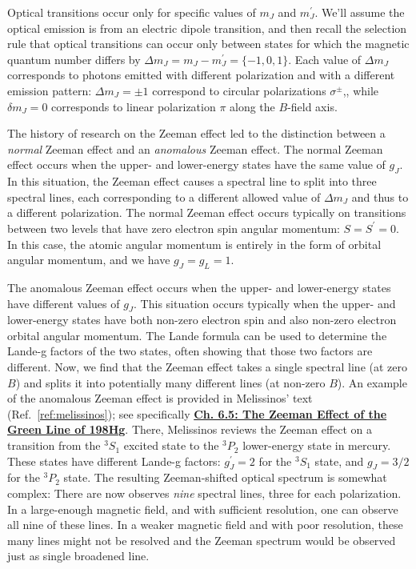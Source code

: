 \documentclass{../lab}
\begin{document}
Optical transitions occur only for specific values of $m_J$ and $m_J^\prime$.  We'll assume the optical emission is from an electric dipole transition, and then recall the selection rule that optical transitions can occur only between states for which the magnetic quantum number differs by $\Delta m_J = m_J - m_J^\prime = \{-1, 0, 1\}$.   Each value of $\Delta m_J$ corresponds to photons emitted with different polarization and with a different emission pattern:  $\Delta m_J = \pm 1$ correspond to circular polarizations $\sigma^\pm$,, while $\delta m_J = 0$ corresponds to linear polarization $\pi$ along the $B$-field axis.

The history of research on the Zeeman effect led to the distinction between a \emph{normal} Zeeman effect and an \emph{anomalous} Zeeman effect.  The normal Zeeman effect occurs when the upper- and lower-energy states have the same value of $g_J$.  In this situation, the Zeeman effect causes a spectral line to split into three spectral lines, each corresponding to a different allowed value of $\Delta m_J$ and thus to a different polarization.  The normal Zeeman effect occurs typically on transitions between two levels that have zero electron spin angular momentum: $S = S^\prime = 0$.  In this case, the atomic angular momentum is entirely in the form of orbital angular momentum, and we have $g_J = g_L = 1$.

The anomalous Zeeman effect occurs when the upper- and lower-energy states have different values of $g_J$.  This situation occurs typically when the upper- and lower-energy states have both non-zero electron spin and also non-zero electron orbital angular momentum.  The Lande formula can be used to determine the Lande-g factors of the two states, often showing that those two factors are different.  Now, we find that the Zeeman effect takes a single spectral line (at zero $B$) and splits it into potentially many different lines (at non-zero $B$). 
An example of the anomalous Zeeman effect is provided in Melissinos' text (Ref.\ \ref{ref:melissinos}); see specifically  \href{https://drive.google.com/file/d/1GhpjxWvfQqXUVwYPoIaDtat9mbd5f0mE/view?usp=drive_link}{\textbf{Ch. 6.5: The Zeeman Effect of the Green Line of 198Hg}}.  There, Melissinos reviews the Zeeman effect on a transition from the $^3S_1$ excited state to the $^3P_2$ lower-energy state in mercury.  These states have different Lande-g factors: $g_J^\prime = 2$ for the $^3S_1$ state, and $g_J = 3/2$ for the $^3P_2$ state.  The resulting Zeeman-shifted optical spectrum is somewhat complex: There are now observes \emph{nine} spectral lines, three for each polarization.  In a large-enough magnetic field, and with sufficient resolution, one can observe all nine of these lines.  In a weaker magnetic field and with poor resolution, these many lines might not be resolved and the Zeeman spectrum would be observed just as single broadened line.
\end{document}
